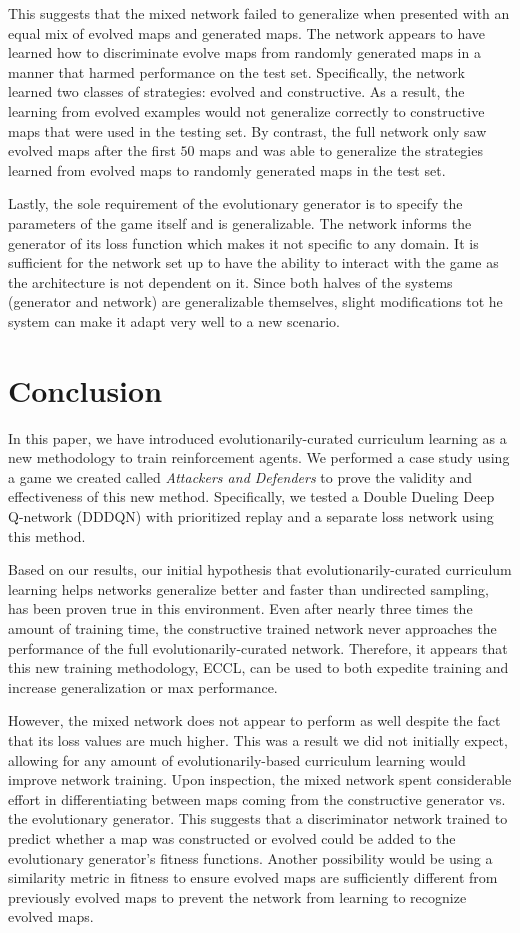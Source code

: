 \documentclass[letterpaper]{article} %
\begin{document}
This suggests that the mixed network failed to generalize when presented with an equal mix of evolved maps and generated maps. The network appears to have learned how to discriminate evolve maps from randomly generated maps in a manner that harmed performance on the test set. Specifically, the network learned two classes of strategies: evolved and constructive. As a result, the learning from evolved examples would not generalize correctly to constructive maps that were used in the testing set. By contrast, the full network only saw evolved maps after the first $50$ maps and was able to generalize the strategies learned from evolved maps to randomly generated maps in the test set.

Lastly, the sole requirement of the evolutionary generator is to specify the parameters of the game itself and is generalizable. The network informs the generator of its loss function which makes it not specific to any domain. It is sufficient for the network set up to have the ability to interact with the game  as the architecture is not dependent on it. Since both halves of the systems (generator and network) are generalizable themselves, slight modifications tot he system can make it adapt very well to a new scenario.

\section{Conclusion}\label{sec:conclusion}
In this paper, we have introduced evolutionarily-curated curriculum learning as a new methodology to train reinforcement agents. We performed a case study using a game we created called \emph{Attackers and Defenders} to prove the validity and effectiveness of this new method. Specifically, we tested a Double Dueling Deep Q-network (DDDQN) with prioritized replay and a separate loss network using this method.

Based on our results, our initial hypothesis that evolutionarily-curated curriculum learning helps networks generalize better and faster than undirected sampling, has been proven true in this environment. Even after nearly three times the amount of training time, the constructive trained network never approaches the performance of the full evolutionarily-curated network. Therefore, it appears that this new training methodology, ECCL, can be used to both expedite training and increase generalization or max performance.

However, the mixed network does not appear to perform as well despite the fact that its loss values are much higher. This was a result we did not initially expect, allowing for any amount of evolutionarily-based curriculum learning would improve network training. Upon inspection, the mixed network spent considerable effort in differentiating between maps coming from the constructive generator vs. the evolutionary generator. This suggests that a discriminator network trained to predict whether a map was constructed or evolved could be added to the evolutionary generator's fitness functions. Another possibility would be using a similarity metric in fitness to ensure evolved maps are sufficiently different from previously evolved maps to prevent the network from learning to recognize evolved maps.
\end{document}
